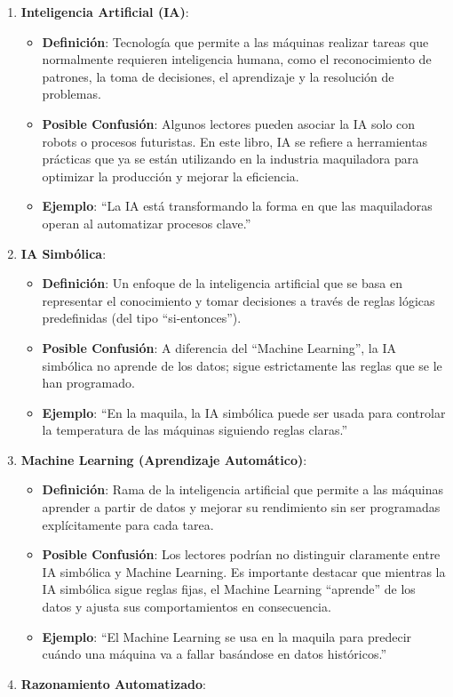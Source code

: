 \documentclass[
  10pt,
  letterpaper,
]{book}
\providecommand{\tightlist}{%
  \setlength{\itemsep}{0pt}\setlength{\parskip}{0pt}}\usepackage{longtable,booktabs,array}
\begin{document}
\begin{enumerate}
\def\labelenumi{\arabic{enumi}.}
\tightlist
\item
  \textbf{Inteligencia Artificial (IA)}:

  \begin{itemize}
  \tightlist
  \item
    \textbf{Definición}: Tecnología que permite a las máquinas realizar
    tareas que normalmente requieren inteligencia humana, como el
    reconocimiento de patrones, la toma de decisiones, el aprendizaje y
    la resolución de problemas.
  \item
    \textbf{Posible Confusión}: Algunos lectores pueden asociar la IA
    solo con robots o procesos futuristas. En este libro, IA se refiere
    a herramientas prácticas que ya se están utilizando en la industria
    maquiladora para optimizar la producción y mejorar la eficiencia.
  \item
    \textbf{Ejemplo}: ``La IA está transformando la forma en que las
    maquiladoras operan al automatizar procesos clave.''
  \end{itemize}
\item
  \textbf{IA Simbólica}:

  \begin{itemize}
  \tightlist
  \item
    \textbf{Definición}: Un enfoque de la inteligencia artificial que se
    basa en representar el conocimiento y tomar decisiones a través de
    reglas lógicas predefinidas (del tipo ``si-entonces'').
  \item
    \textbf{Posible Confusión}: A diferencia del ``Machine Learning'',
    la IA simbólica no aprende de los datos; sigue estrictamente las
    reglas que se le han programado.
  \item
    \textbf{Ejemplo}: ``En la maquila, la IA simbólica puede ser usada
    para controlar la temperatura de las máquinas siguiendo reglas
    claras.''
  \end{itemize}
\item
  \textbf{Machine Learning (Aprendizaje Automático)}:

  \begin{itemize}
  \tightlist
  \item
    \textbf{Definición}: Rama de la inteligencia artificial que permite
    a las máquinas aprender a partir de datos y mejorar su rendimiento
    sin ser programadas explícitamente para cada tarea.
  \item
    \textbf{Posible Confusión}: Los lectores podrían no distinguir
    claramente entre IA simbólica y Machine Learning. Es importante
    destacar que mientras la IA simbólica sigue reglas fijas, el Machine
    Learning ``aprende'' de los datos y ajusta sus comportamientos en
    consecuencia.
  \item
    \textbf{Ejemplo}: ``El Machine Learning se usa en la maquila para
    predecir cuándo una máquina va a fallar basándose en datos
    históricos.''
  \end{itemize}
\item
  \textbf{Razonamiento Automatizado}:


\end{enumerate}
\end{document}
